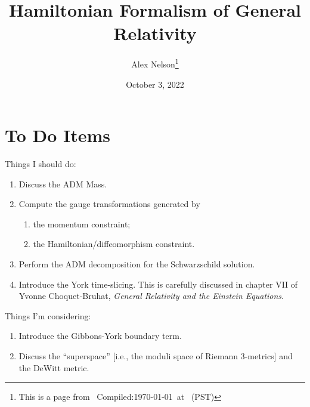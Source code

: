 \documentclass{article}
\title{Hamiltonian Formalism of General Relativity}
\author{Alex Nelson\thanks{This is a page from \homeurl{}\hfil\break\indent\;\, Compiled:\enspace\today\ at \currenttime\ (PST)}}
\date{October 3, 2022}
\numberwithin{equation}{section}
\begin{document}
\maketitle





\section*{To Do Items}

Things I should do:
\begin{enumerate}
\item Discuss the ADM Mass.
\item Compute the gauge transformations generated by
  \begin{enumerate}
  \item the momentum constraint;
  \item the Hamiltonian/diffeomorphism constraint.
  \end{enumerate}
\item Perform the ADM decomposition for the Schwarzschild solution.
\item Introduce the York time-slicing. This is carefully discussed in
  chapter VII of 
  Yvonne Choquet-Bruhat,
  \textit{General Relativity and the Einstein Equations}.
\end{enumerate}

Things I'm considering:
\begin{enumerate}
\item Introduce the Gibbons-York boundary term.
\item Discuss the ``superspace'' [i.e., the moduli space of Riemann
  3-metrics] and the DeWitt metric.
\end{enumerate}

\end{document}
